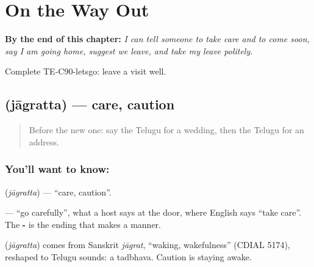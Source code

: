 
\chapter{On the Way Out}
\label{ch:te-on-the-way-out}

\begin{chapteropening}
\textbf{By the end of this chapter:} \emph{I can tell someone to take care and to come soon, say I am going home, suggest we leave, and take my leave politely.}

Complete TE-C90-letsgo: leave a visit well.
\end{chapteropening}

\section[\texorpdfstring{\te{జాగ్రత్త} (jāgratta)}{జాగ్రత్త (jāgratta)}]{ (jāgratta) — care, caution}

\label{lesson:TE-C90-care}



\begin{quote}
Before the new one: say the Telugu for a wedding, then the Telugu for an address.
\end{quote}

\subsection*{You'll want to know: }
\textbf{} (\emph{jāgratta}) — \textquotedblleft{}care, caution\textquotedblright{}.

\textbf{ } — \textquotedblleft{}go carefully\textquotedblright{}, what a host says at the door, where English says \textquotedblleft{}take care\textquotedblright{}. The \textbf{-} is the ending that makes a manner.

\begin{cousinweb}
\textbf{} (\emph{jāgratta}) comes from Sanskrit \emph{jāgrat}, \textquotedblleft{}waking, wakefulness\textquotedblright{} (CDIAL 5174), reshaped to Telugu sounds: a tadbhava. Caution is staying awake.
\end{cousinweb}

